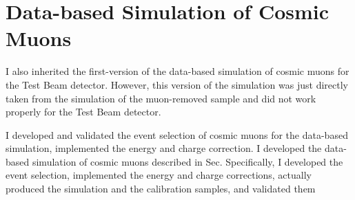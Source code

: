 
\section*{Data-based Simulation of Cosmic Muons}
 I also inherited the first-version of the data-based simulation of cosmic muons for the Test Beam detector. However, this version of the simulation was just directly taken from the simulation of the muon-removed sample and did not work properly for the Test Beam detector. 

I developed and validated the event selection of cosmic muons for the data-based simulation, implemented the energy and charge correction. I developed the data-based simulation of cosmic muons described in Sec. Specifically, I developed the event selection, implemented the energy and charge corrections, actually produced the simulation and the calibration samples, and validated them

